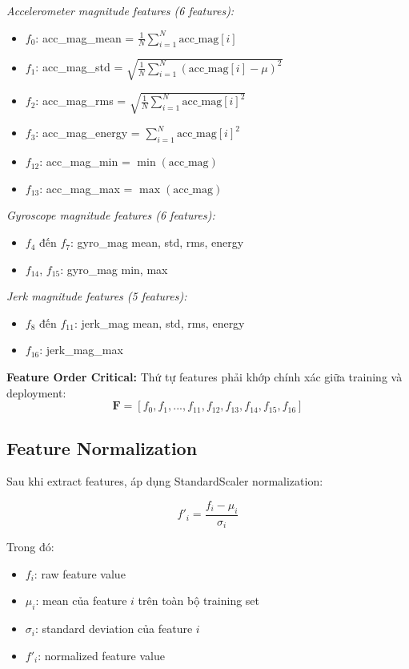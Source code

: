 \textit{Accelerometer magnitude features (6 features):}
\begin{itemize}
    \item $f_0$: acc\_mag\_mean = $\frac{1}{N}\sum_{i=1}^{N} \text{acc\_mag}[i]$
    \item $f_1$: acc\_mag\_std = $\sqrt{\frac{1}{N}\sum_{i=1}^{N}(\text{acc\_mag}[i] - \mu)^2}$
    \item $f_2$: acc\_mag\_rms = $\sqrt{\frac{1}{N}\sum_{i=1}^{N}\text{acc\_mag}[i]^2}$
    \item $f_3$: acc\_mag\_energy = $\sum_{i=1}^{N}\text{acc\_mag}[i]^2$
    \item $f_{12}$: acc\_mag\_min = $\min(\text{acc\_mag})$
    \item $f_{13}$: acc\_mag\_max = $\max(\text{acc\_mag})$
\end{itemize}

\textit{Gyroscope magnitude features (6 features):}
\begin{itemize}
    \item $f_4$ đến $f_7$: gyro\_mag mean, std, rms, energy
    \item $f_{14}$, $f_{15}$: gyro\_mag min, max
\end{itemize}

\textit{Jerk magnitude features (5 features):}
\begin{itemize}
    \item $f_8$ đến $f_{11}$: jerk\_mag mean, std, rms, energy
    \item $f_{16}$: jerk\_mag\_max
\end{itemize}

\textbf{Feature Order Critical:} Thứ tự features phải khớp chính xác giữa training và deployment:
\begin{equation}
\mathbf{F} = [f_0, f_1, ..., f_{11}, f_{12}, f_{13}, f_{14}, f_{15}, f_{16}]
\end{equation}

\subsection{Feature Normalization}
Sau khi extract features, áp dụng StandardScaler normalization:

\begin{equation}
f'_i = \frac{f_i - \mu_i}{\sigma_i}
\end{equation}

Trong đó:
\begin{itemize}
    \item $f_i$: raw feature value
    \item $\mu_i$: mean của feature $i$ trên toàn bộ training set
    \item $\sigma_i$: standard deviation của feature $i$
    \item $f'_i$: normalized feature value
\end{itemize}


